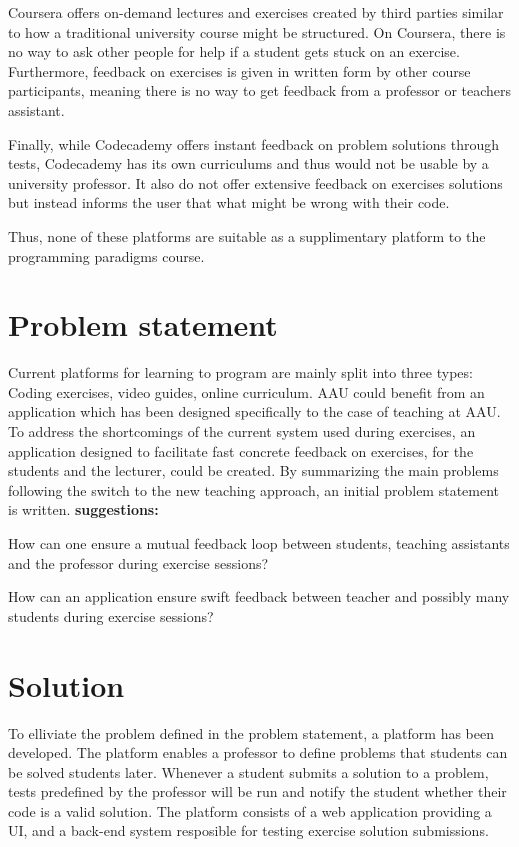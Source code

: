 Coursera offers on-demand lectures and exercises created by third parties similar to how a traditional university course might be structured.
On Coursera, there is no way to ask other people for help if a student gets stuck on an exercise.
Furthermore, feedback on exercises is given in written form by other course participants, meaning there is no way to get feedback from a professor or teachers assistant. 


Finally, while Codecademy offers instant feedback on problem solutions through tests, Codecademy has its own curriculums and thus would not be usable by a university professor. 
It also do not offer extensive feedback on exercises solutions but instead informs the user that what might be wrong with their code. 


Thus, none of these platforms are suitable as a supplimentary platform to the programming paradigms course. 
\section{Problem statement}
Current platforms for learning to program are mainly split into three types: Coding exercises, video guides, online curriculum. 
AAU could benefit from an application which has been designed specifically to the case of teaching at AAU.
To address the shortcomings of the current system used during exercises, an application designed to facilitate fast concrete feedback on exercises, for the students and the lecturer, could be created.
By summarizing the main problems following the switch to the new teaching approach, an initial problem statement is written.
\textbf{suggestions:}
\begin{displayquote}
How can one ensure a mutual feedback loop between students, teaching assistants and the professor during exercise sessions?
\end{displayquote} 

\begin{displayquote}
    How can an application ensure swift feedback between teacher and possibly many students during exercise sessions?
\end{displayquote} 

\section{Solution}
To elliviate the problem defined in the problem statement, a platform has been developed.
The platform enables a professor to define problems that students can be solved students later.
Whenever a student submits a solution to a problem, tests predefined by the professor will be run and notify the student whether their code is a valid solution.
The platform consists of a web application providing a UI, and a back-end system resposible for testing exercise solution submissions.

